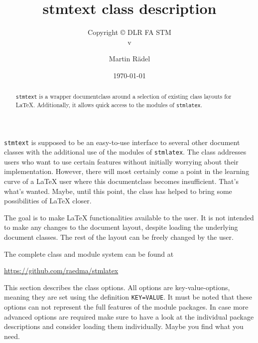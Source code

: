 \documentclass[%
  type=article,%
  layout=koma,%
  page=false,%
  cleveref=true,%
  conditionallox=true,%
  conditionalloxnewpage=true,%
  date=true,%
  glossaries=true,%
  hyperref=true,%
  index=true,%
  listings=true%
]{stmtext}
\author{Martin R\"{a}del}
\title{stmtext class description}
\subtitle{Copyright \copyright{} \the\year{} DLR FA STM\\v\formatdate[versiondatestyle]{\DTMToday}}
\date{\today}
\begin{document}
\maketitle

\begin{abstract}
\texttt{stmtext} is a wrapper documentclass around a selection of existing class layouts for \LaTeX. Additionally, it allows quick access to the modules of \texttt{stmlatex}.
\end{abstract}

\secondpage

\tableofcontents

\conditionallistoffigures  %
\conditionallistoftables   %
\conditionallistoflistings %

\setcounter{currentlevel}{\basetoclevelnr}
\label{sec:about}

\texttt{stmtext} is supposed to be an easy-to-use interface to several other document classes with the additional use of the modules of \texttt{stmlatex}. The class addresses users who want to use certain features without initially worrying about their implementation. However, there will most certainly come a point in the learning curve of a \LaTeX{} user where this documentclass becomes insufficient. That's what's wanted. Maybe, until this point, the class has helped to bring some possibilities of \LaTeX{} closer. 

The goal is to make \LaTeX{} functionalities available to the user. It is not intended to make any changes to the document layout, despite loading the underlying document classes. The rest of the layout can be freely changed by the user.

The complete class and module system can be found at

\href{https://github.com/raedma/stmlatex}{https://github.com/raedma/stmlatex}


\setcounter{currentlevel}{\basetoclevelnr}
\label{sec:options}

This section describes the class options. All options are key-value-options, meaning they are set using the definition \texttt{KEY=VALUE}. It must be noted that these options can not represent the full features of the module packages. In case more advanced options are required make sure to have a look at the individual package descriptions and consider loading them individually. Maybe you find what you need.
\end{document}
